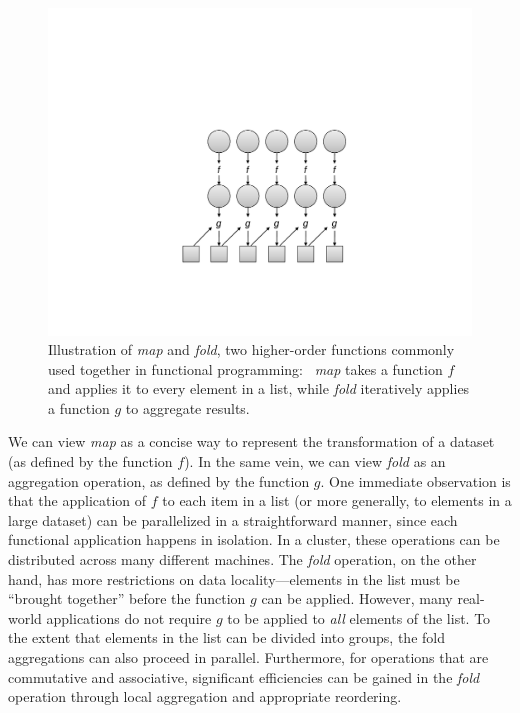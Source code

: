 \begin{figure}[t]
\begin{center}
\vspace{0.2cm}
\includegraphics[scale=0.6]{figures/fig-ch2-functional-programming.pdf}
\vspace{-0.3cm}
\end{center}
\caption{Illustration of \emph{map} and \emph{fold}, two higher-order
  functions commonly used together in functional programming:\ \emph{
    map} takes a function $f$ and applies it to every element in a
    list, while \emph{fold} iteratively applies a function $g$ to
    aggregate results.}
\label{figure:chapter2:functional}
\end{figure}

We can view \emph{map} as a concise way to represent the transformation
of a dataset (as defined by the function $f$).  In the same vein, we
can view \emph{fold} as an aggregation operation, as defined by the
function $g$.  One immediate observation is that the application of
$f$ to each item in a list (or more generally, to elements in a large
dataset) can be parallelized in a straightforward manner, since each
functional application happens in isolation.  In a cluster, these
operations can be distributed across many different machines.  The
\emph{fold} operation, on the other hand, has more restrictions on data
locality---elements in the list must be ``brought together'' before
the function $g$ can be applied.  However, many real-world
applications do not require $g$ to be applied to \emph{all} elements of
the list.  To the extent that elements in the list can be divided into
groups, the fold aggregations can also proceed in parallel.
Furthermore, for operations that are commutative and associative,
significant efficiencies can be gained in the \emph{fold} operation
through local aggregation and appropriate reordering.

